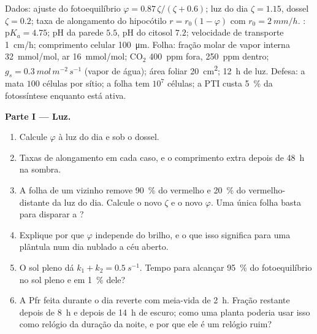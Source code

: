 \begin{problem}
\label{pb:b3:plant-molecular-physiology:1}
Dados: ajuste do fotoequilíbrio $\varphi = 0.87\,\zeta/(\zeta + 0.6)$;
luz do dia $\zeta = 1.15$, dossel $\zeta = 0.2$; taxa de alongamento do
hipocótilo $r = r_{0}(1 - \varphi)$ com $r_{0} = \qty{2}{mm/h}$. :
$\mathrm{p}K_{a} = 4.75$; pH da parede $5.5$, pH do citosol $7.2$;
velocidade de transporte \qty{1}{cm/h}; comprimento celular
\qty{100}{\micro m}. Folha: fração molar de vapor interna
\qty{32}{mmol/mol}, ar \qty{16}{mmol/mol}; CO$_{2}$ \qty{400}{ppm} fora,
\qty{250}{ppm} dentro; $g_{s} =
\qty{0.3}{mol\,m^{-2}\,s^{-1}}$ (vapor de
água); área foliar \qty{20}{cm^2}; \qty{12}{h} de luz. Defesa: a  mata $100$ células por sítio; a folha tem $10^{7}$ células;
a PTI custa \qty{5}{\%} da fotossíntese enquanto está ativa.

\medskip
\noindent\textbf{Parte I --- Luz.}
\begin{enumerate}
  \item Calcule $\varphi$ à luz do dia e sob o dossel.
  \item Taxas de alongamento em cada caso, e o comprimento extra depois
        de \qty{48}{h} na sombra.
  \item A folha de um vizinho remove \qty{90}{\%} do vermelho e
        \qty{20}{\%} do vermelho-distante da luz do dia. Calcule o novo
        $\zeta$ e o novo $\varphi$. Uma única folha basta para disparar a
        ?
  \item Explique por que $\varphi$ independe do brilho, e o que isso
        significa para uma plântula num dia nublado a céu aberto.
  \item O sol pleno dá $k_{1} + k_{2} = \qty{0.5}{s^{-1}}$. Tempo para
        alcançar \qty{95}{\%} do fotoequilíbrio no sol pleno e em
        \qty{1}{\%} dele?
  \item A Pfr feita durante o dia reverte com meia-vida de \qty{2}{h}.
        Fração restante depois de \qty{8}{h} e depois de \qty{14}{h} de
        escuro; como uma planta poderia usar isso como relógio da duração
        da noite, e por que ele é um relógio ruim?
\end{enumerate}


\end{problem}

